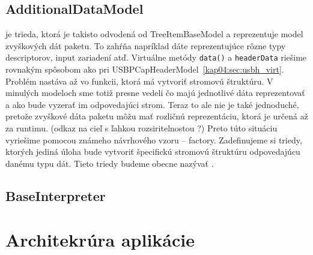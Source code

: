 \subsection{AdditionalDataModel}
je trieda, ktorá je takisto odvodená od TreeItemBaseModel a reprezentuje model zvyškových dát paketu. To zahŕňa napríklad dáte reprezentujúce rôzne typy descriptorov, input zariadení atď. Virtuálne metódy \texttt{data()} a \texttt{headerData} riešime rovnakým spôsobom ako pri USBPCapHeaderModel~\ref{kap04:sec:usbh_virt}. Problém nastáva až vo funkcii, ktorá má vytvoriť stromovú štruktúru. V minulých modeloch sme totiž presne vedeli čo majú jednotlivé dáta reprezentovať a ako bude vyzerať im odpovedajúci strom. Teraz to ale nie je také jednoduché, pretože zvyškové dáta paketu môžu mať rozličnú reprezentáciu, ktorá je určená až za runtimu. (odkaz na cieľ s ľahkou rozsiritelnostou ?) Preto túto situáciu vyriešime pomocou známeho návrhového vzoru -- factory. Zadefinujeme si triedy, ktorých jediná úloha bude vytvoriť špecifickú stromovú štruktúru odpovedajúcu danému typu dát. Tieto triedy budeme obecne nazývať .

\subsection{BaseInterpreter}































\newpage
\section{Architekrúra aplikácie}
